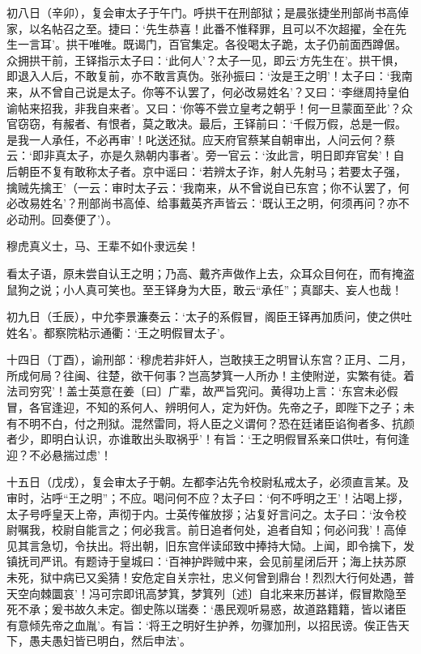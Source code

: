\documentclass[]{article}
\begin{document}
初八日（辛卯），复会审太子于午门。呼拱干在刑部狱；是晨张捷坐刑部尚书高倬家，以名帖召之至。捷曰：`先生恭喜！此番不惟释罪，且可以不次超擢，全在先生一言耳'。拱干唯唯。既谒门，百官集定。各役喝太子跪，太子仍前面西蹲倨。众拥拱干前，王铎指示太子曰：`此何人'？太子一见，即云`方先生在'。拱干惧，即退入人后，不敢复前，亦不敢言真伪。张孙振曰：`汝是王之明'！太子曰：`我南来，从不曾自己说是太子。你等不认罢了，何必改易姓名'？又曰：`李继周持皇伯谕帖来招我，非我自来者'。又曰：`你等不尝立皇考之朝乎！何一旦蒙面至此'？众官窃窃，有赧者、有恨者，莫之敢决。最后，王铎前曰：`千假万假，总是一假。是我一人承任，不必再审'！叱送还狱。应天府官蔡某自朝审出，人问云何？蔡云：`即非真太子，亦是久熟朝内事者'。旁一官云：`汝此言，明日即弃官矣'！自后朝臣不复有敢称太子者。京中谣曰：`若辨太子诈，射人先射马；若要太子强，擒贼先擒王'（一云：审时太子云：`我南来，从不曾说自已东宫；你不认罢了，何必改易姓名'？刑部尚书高倬、给事戴英齐声皆云：`既认王之明，何须再问？亦不必动刑。回奏便了'）。

穆虎真义士，马、王辈不如仆隶远矣！

看太子语，原未尝自认王之明；乃高、戴齐声做作上去，众耳众目何在，而有掩盗鼠狗之说；小人真可笑也。至王铎身为大臣，敢云``承任''；真鄙夫、妄人也哉！

初九日（壬辰），中允李景濂奏云：`太子的系假冒，阁臣王铎再加质问，使之供吐姓名'。都察院粘示通衢：`王之明假冒太子'。

十四日（丁酉），谕刑部：`穆虎若非奸人，岂敢挟王之明冒认东宫？正月、二月，所成何局？往闽、往楚，欲干何事？岂高梦箕一人所办！主使附逆，实繁有徒。着法司穷究'！盖士英意在姜〔曰〕广辈，故严旨究问。黄得功上言：`东宫未必假冒，各官逢迎，不知的系何人、辨明何人，定为奸伪。先帝之子，即陛下之子；未有不明不白，付之刑狱。混然雷同，将人臣之义谓何？恐在廷诸臣谄徇者多、抗颜者少，即明白认识，亦谁敢出头取祸乎'！有旨：`王之明假冒系亲口供吐，有何逢迎？不必悬揣过虑'！

十五日（戊戌），复会审太子于朝。左都李沾先令校尉私戒太子，必须直言某。及审时，沾呼``王之明''；不应。喝问何不应？太子曰：`何不呼明之王'！沾喝上拶，太子号呼皇天上帝，声彻于内。士英传催放拶；沾复好言问之。太子曰：`汝令校尉嘱我，校尉自能言之；何必我言。前日追者何处，追者自知；何必问我'！高倬见其言急切，令扶出。将出朝，旧东宫伴读邱致中捧持大恸。上闻，即令擒下，发镇抚司严讯。有题诗于皇城曰：`百神护跸贼中来，会见前星闭后开；海上扶苏原未死，狱中病已又奚猜！安危定自关宗社，忠义何曾到鼎台！烈烈大行何处遇，普天空向棘圜哀'！冯可宗即讯高梦箕，梦箕列〔述〕自北来来历甚详，假冒欺隐至死不承；爰书故久未定。御史陈以瑞奏：`愚民观听易惑，故道路籍籍，皆以诸臣有意倾先帝之血胤'。有旨：`将王之明好生护养，勿骤加刑，以招民谤。俟正告天下，愚夫愚妇皆已明白，然后申法'。
\end{document}
